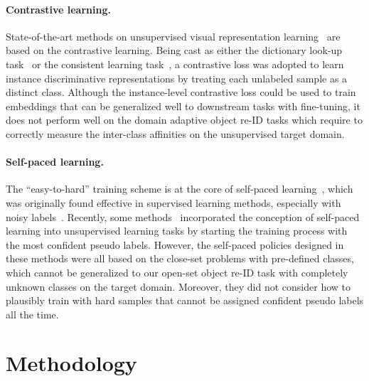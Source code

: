 \documentclass{article}
\begin{document}
\paragraph{Contrastive learning.}
State-of-the-art methods on unsupervised visual representation learning~\cite{oord2018representation,wu2018unsupervised,hjelm2019learning,tian2019contrastive,zhuang2019local,he2019momentum,chen2020simple} are based on the contrastive learning.
Being cast as either the dictionary look-up task~\cite{wu2018unsupervised,he2019momentum} or the consistent learning task~\cite{tian2019contrastive,chen2020simple},
a contrastive loss was adopted to learn instance discriminative representations by treating each unlabeled sample as a distinct class.
Although the instance-level contrastive loss could be used to train embeddings that can be generalized well to downstream tasks with fine-tuning,
it does not perform well on the domain adaptive object re-ID tasks which require to correctly 
measure the inter-class affinities 
on the unsupervised target domain.


\vspace{-5pt}
\paragraph{Self-paced learning.}
The ``easy-to-hard'' training scheme
is at the core of self-paced learning~\cite{kumar2010self},
which was originally found effective in supervised learning methods, especially with noisy labels~\cite{guo2018curriculumnet,jiang2018mentornet,lin2017active,ge2020self}.
Recently, some methods~\cite{tang2012shifting,guo2019adaptive,choi2019pseudo,zhang2017curriculum,zou2018unsupervised} incorporated the conception of self-paced learning into unsupervised learning tasks by starting the training process with the most confident pseudo labels.
However, the self-paced policies designed in these methods were all based on the close-set problems with pre-defined classes, which cannot be generalized to our open-set object re-ID task with completely unknown classes on the target domain.
Moreover,
they did not consider how to plausibly train with hard samples that cannot be assigned confident pseudo labels all the time.



\section{Methodology}
\vspace{-5pt}
\end{document}
